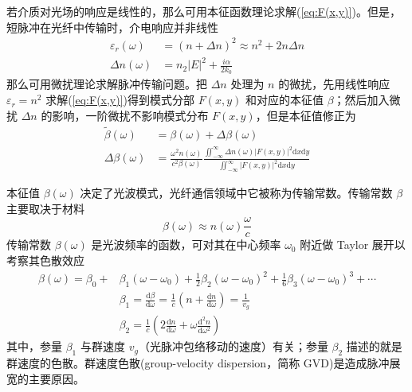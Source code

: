 若介质对光场的响应是线性的，那么可用本征函数理论求解(\ref{eq:F(x,y)})。但是，短脉冲在光纤中传输时，介电响应并非线性
\begin{align}
    \varepsilon_r(\omega)&=(n+\Delta n)^2\approx n^2+2n\Delta n\\
    \Delta n(\omega)&=n_2|E|^2+\frac{i\alpha}{2k_0} \nonumber
\end{align}
那么可用微扰理论求解脉冲传输问题\cite{Agrawal}。把 $\Delta n$ 处理为 $n$ 的微扰，先用线性响应 $\varepsilon_r=n^2$ 求解(\ref{eq:F(x,y)})得到模式分部 $F(x,y)$ 和对应的本征值 $\beta$；然后加入微扰 $\Delta n$ 的影响，一阶微扰不影响模式分布 $F(x,y)$，但是本征值修正为
\begin{align}
    \widetilde{\beta}(\omega)&=\beta(\omega)+\Delta\beta(\omega)\\
    \Delta\beta(\omega)&=\frac{\omega^2n(\omega)}{c^2\beta(\omega)}\frac{\iint_{-\infty}^{\infty}\Delta n(\omega)|F(x,y)|^2\mathrm{d}x\mathrm{d}y}{\iint_{-\infty}^{\infty}|F(x,y)|^2\mathrm{d}x\mathrm{d}y} \nonumber
\end{align}

本征值 $\beta(\omega)$ 决定了光波模式，光纤通信领域中它被称为传输常数。传输常数 $\beta$ 主要取决于材料
\begin{equation}
    \beta(\omega)\approx n(\omega)\frac{\omega}{c}
\end{equation}
传输常数 $\beta(\omega)$ 是光波频率的函数，可对其在中心频率 $\omega_0$ 附近做 Taylor 展开以考察其色散效应
\begin{subequations}
    \begin{align}
        \beta(\omega)=\beta_0+&\beta_1(\omega-\omega_0)+\frac{1}{2}\beta_2(\omega-\omega_0)^2+\frac{1}{6}\beta_3(\omega-\omega_0)^3+\cdots \nonumber \\
        &\beta_1=\frac{\mathrm{d}\beta}{\mathrm{d}\omega}=\frac{1}{c}\left(n+\frac{\mathrm{d}n}{\mathrm{d}\omega}\right)=\frac{1}{v_g}\\
        &\beta_2=\frac{1}{c}\left(2\frac{\mathrm{d}n}{\mathrm{d}\omega}+\omega\frac{\mathrm{d}^2n}{\mathrm{d}\omega^2}\right)
    \end{align}
\end{subequations}
其中，参量 $\beta_1$ 与群速度 $v_g$（光脉冲包络移动的速度）有关；参量 $\beta_2$ 描述的就是群速度的色散。群速度色散(group-velocity dispersion，简称 GVD)是造成脉冲展宽的主要原因。

